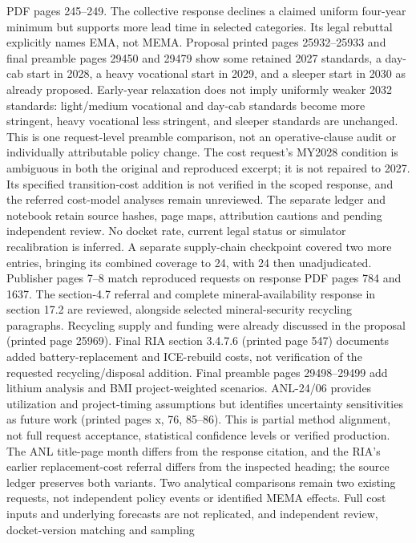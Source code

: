PDF pages 245--249. The collective response declines a claimed uniform four-year
minimum but supports more lead time in selected categories. Its legal rebuttal
explicitly names EMA, not MEMA. Proposal printed pages 25932--25933 and final
preamble pages 29450 and 29479 show some retained 2027 standards, a day-cab
start in 2028, a heavy vocational start in 2029, and a sleeper start in 2030
as already proposed. Early-year relaxation does not imply uniformly weaker
2032 standards: light/medium vocational and day-cab standards become more
stringent, heavy vocational less stringent, and sleeper standards are unchanged.
This is one request-level preamble comparison, not an operative-clause audit
or individually attributable policy change. The cost request's MY2028 condition
is ambiguous in both the original and reproduced excerpt; it is not repaired
to 2027. Its specified transition-cost addition is not verified in the scoped
response, and the referred cost-model analyses remain unreviewed. The separate
ledger and notebook retain source hashes, page maps, attribution cautions and
pending independent review. No docket rate, current legal status or simulator
recalibration is inferred.
A separate supply-chain checkpoint covered two more entries, bringing its combined
coverage to 24, with 24 then unadjudicated. Publisher pages 7--8 match reproduced
requests on response PDF pages 784 and 1637. The section-4.7 referral and complete
mineral-availability response in section 17.2 are reviewed, alongside selected
mineral-security recycling paragraphs. Recycling supply and funding were already
discussed in the proposal (printed page 25969). Final RIA section 3.4.7.6
(printed page 547) documents added battery-replacement and ICE-rebuild costs,
not verification of the requested recycling/disposal addition. Final preamble
pages 29498--29499 add lithium analysis and BMI project-weighted scenarios.
ANL-24/06 provides utilization and project-timing assumptions but identifies
uncertainty sensitivities as future work (printed pages x, 76, 85--86).
This is partial method alignment, not full request acceptance, statistical
confidence levels or verified production. The ANL title-page month differs from
the response citation, and the RIA's earlier replacement-cost referral differs
from the inspected heading; the source ledger preserves both variants.
Two analytical comparisons remain two existing requests, not independent policy
events or identified MEMA effects. Full cost inputs and underlying forecasts are
not replicated, and independent review, docket-version matching and sampling
